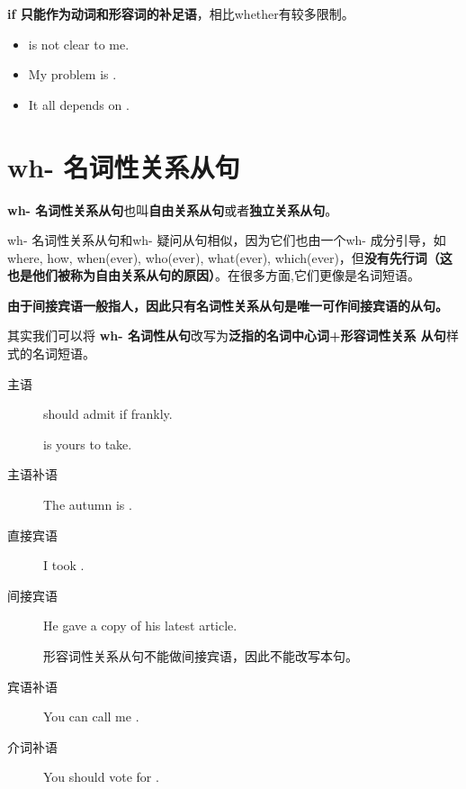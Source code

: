 \textbf{if 只能作为动词和形容词的补足语}，相比whether有较多限制。

\begin{itemize}
\item {} is not clear to me.

\item My problem is .

\item It all depends on .
\end{itemize}

\section{wh- 名词性关系从句}
\label{subsubsec:whnoun}

\textbf{wh-  名词性关系从句}也叫\textbf{自由关系从句}或者\textbf{独立关系从句}。

wh- 名词性关系从句和wh- 疑问从句相似，因为它们也由一个wh- 成分引导，如where,
how, when(ever), who(ever), what(ever), which(ever)，但\textbf{没有先行词（这
  也是他们被称为自由关系从句的原因）}。在很多方面,它们更像是名词短语。

\textbf{由于间接宾语一般指人，因此只有名词性关系从句是唯一可作间接宾语的从句。}

其实我们可以将 \textbf{wh- 名词性从句}改写为\textbf{泛指的名词中心词+形容词性关系
  从句}样式的名词短语。
\begin{description}
\item[主语]  should admit if frankly.

   is yours to take.
\item[主语补语] The autumn is .
\item[直接宾语] I took .
\item[间接宾语] He gave  a copy of his latest
  article.

  形容词性关系从句不能做间接宾语，因此不能改写本句。
\item[宾语补语] You can call me .
\item[介词补语] You should vote for .
\end{description}

